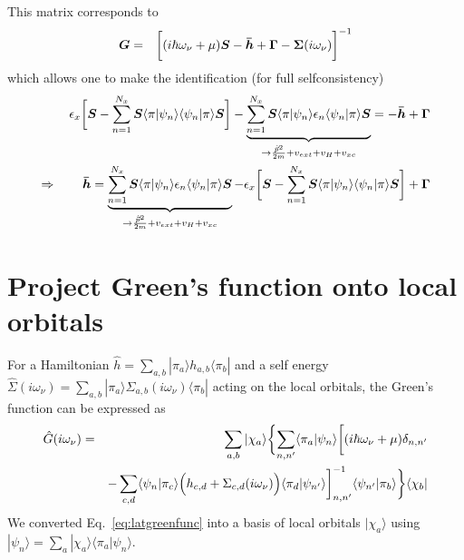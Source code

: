 \documentclass[11pt,a4paper]{report}
\begin{document}
This matrix corresponds to
\begin{eqnarray}
\bm{G}&=&
\biggl[(i\hbar\omega_\nu+\mu)\bm{S}-\bm{\bar{h}}+\bm{\Gamma}
-\bm{\Sigma}(i\omega_\nu)\biggr]^{-1}
\end{eqnarray}
which allows one to make the identification (for full selfconsistency)
\begin{eqnarray}
\epsilon_x
\biggl[\bm{S}
-\sum_{n=1}^{N_x}
\bm{S}\langle\pi|\psi_n\rangle\langle\psi_n|\pi\rangle\bm{S}\biggr]
-
\underbrace{\sum_{n=1}^{N_x}
\bm{S}\langle\pi|\psi_n\rangle\epsilon_n\langle\psi_n|\pi\rangle\bm{S}
}_{\rightarrow \frac{\hat{\vec{p}}^2}{2m}+v_{ext}+v_H+v_{xc}}
=-\bm{\bar{h}}+\bm{\Gamma}
\nonumber\\
\Rightarrow\qquad
\bm{\bar{h}}
=
\underbrace{\sum_{n=1}^{N_x}
\bm{S}\langle\pi|\psi_n\rangle\epsilon_n\langle\psi_n|\pi\rangle\bm{S}
}_{\rightarrow \frac{\hat{\vec{p}}^2}{2m}+v_{ext}+v_H+v_{xc}}
-\epsilon_x
\biggl[\bm{S}
-\sum_{n=1}^{N_x}
\bm{S}\langle\pi|\psi_n\rangle\langle\psi_n|\pi\rangle\bm{S}\biggr]
+\bm{\Gamma}
\end{eqnarray}


\section{Project Green's function onto local orbitals}
For a Hamiltonian $\hat{h}=\sum_{a,b}|\pi_a\rangle
h_{a,b}\langle\pi_b|$ and a self energy 
$\hat{\Sigma}(i\omega_\nu)=
\sum_{a,b}|\pi_a\rangle
\Sigma_{a,b}(i\omega_\nu)
\langle\pi_b|$
acting on the local orbitals, the Green's function can be expressed
as
\begin{eqnarray}
\hat{G}(i\omega_\nu)&=&
\sum_{a,b}|\chi_a\rangle
\biggl\lbrace
\sum_{n,n'}\langle\pi_a|\psi_n\rangle
\biggl[
(i\hbar\omega_\nu+\mu)\delta_{n,n'}
\nonumber\\
&&-\sum_{c,d}\langle\psi_n|\pi_c\rangle
\Bigl(h_{c,d}+\Sigma_{c,d}(i\omega_\nu)\Bigr)
\langle\pi_d|\psi_{n'}\rangle
\biggr]^{-1}_{n,n'}
\langle\psi_{n'}|\pi_b\rangle
\biggr\rbrace
\langle\chi_b|
\label{eq:greenlocorb}
\end{eqnarray}
We converted Eq.~\eqref{eq:latgreenfunc} into a basis of local
orbitals $|\chi_a\rangle$ using
$|\psi_n\rangle=\sum_a|\chi_a\rangle\langle\pi_a|\psi_n\rangle$.
\end{document}
